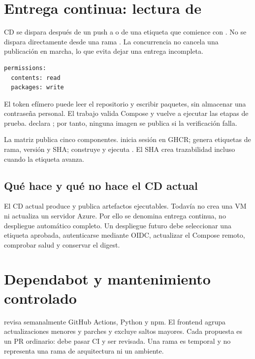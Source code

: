 \section{Entrega continua: lectura de }

CD se dispara después de un push a  o de una etiqueta que comience con . No se dispara directamente desde una rama . La concurrencia no cancela una publicación en marcha, lo que evita dejar una entrega incompleta.

\begin{lstlisting}[style=terminal]
permissions:
  contents: read
  packages: write
\end{lstlisting}

El token efímero  puede leer el repositorio y escribir paquetes, sin almacenar una contraseña personal. El trabajo  valida Compose y vuelve a ejecutar las etapas de prueba.  declara ; por tanto, ninguna imagen se publica si la verificación falla.

La matriz publica cinco componentes.  inicia sesión en GHCR;  genera etiquetas de rama, versión y SHA;  construye  y ejecuta . El SHA crea trazabilidad incluso cuando la etiqueta  avanza.

\subsection{Qué hace y qué no hace el CD actual}

El CD actual produce y publica artefactos ejecutables. Todavía no crea una VM ni actualiza un servidor Azure. Por ello se denomina entrega continua, no despliegue automático completo. Un despliegue futuro debe seleccionar una etiqueta aprobada, autenticarse mediante OIDC, actualizar el Compose remoto, comprobar salud y conservar el digest.

\section{Dependabot y mantenimiento controlado}

 revisa semanalmente GitHub Actions, Python y npm. El frontend agrupa actualizaciones menores y parches y excluye saltos mayores. Cada propuesta es un PR ordinario: debe pasar CI y ser revisada. Una rama  es temporal y no representa una rama de arquitectura ni un ambiente.


